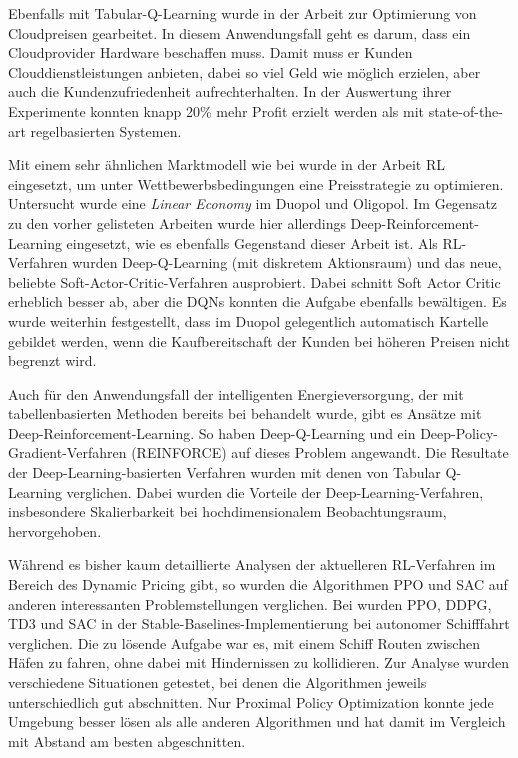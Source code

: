 Ebenfalls mit Tabular-Q-Learning wurde in der Arbeit \cite{9086147} zur Optimierung von Cloudpreisen gearbeitet.
In diesem Anwendungsfall geht es darum, dass ein Cloudprovider Hardware beschaffen muss.
Damit muss er Kunden Clouddienstleistungen anbieten, dabei so viel Geld wie möglich erzielen, aber auch die Kundenzufriedenheit aufrechterhalten.
In der Auswertung ihrer Experimente konnten knapp 20\% mehr Profit erzielt werden als mit state-of-the-art regelbasierten Systemen.

Mit einem sehr ähnlichen Marktmodell wie bei \cite{10.1145/3219819.3219833} wurde in der Arbeit \cite{Kastius2022} RL eingesetzt, um unter Wettbewerbsbedingungen eine Preisstrategie zu optimieren.
Untersucht wurde eine \textit{Linear Economy} im Duopol und Oligopol.
Im Gegensatz zu den vorher gelisteten Arbeiten wurde hier allerdings Deep-Reinforcement-Learning eingesetzt, wie es ebenfalls Gegenstand dieser Arbeit ist.
Als RL-Verfahren wurden Deep-Q-Learning (mit diskretem Aktionsraum) und das neue, beliebte Soft-Actor-Critic-Verfahren ausprobiert.
Dabei schnitt Soft Actor Critic erheblich besser ab, aber die DQNs konnten die Aufgabe ebenfalls bewältigen.
Es wurde weiterhin festgestellt, dass im Duopol gelegentlich automatisch Kartelle gebildet werden, wenn die Kaufbereitschaft der Kunden bei höheren Preisen nicht begrenzt wird.

Auch für den Anwendungsfall der intelligenten Energieversorgung, der mit tabellenbasierten Methoden bereits bei \cite{Kim2016DynamicPA} behandelt wurde, gibt es Ansätze mit Deep-Reinforcement-Learning.
So haben \cite{8356086} Deep-Q-Learning und ein Deep-Policy-Gradient-Verfahren (REINFORCE) auf dieses Problem angewandt.
Die Resultate der Deep-Learning-basierten Verfahren wurden mit denen von Tabular Q-Learning verglichen.
Dabei wurden die Vorteile der Deep-Learning-Verfahren, insbesondere Skalierbarkeit bei hochdimensionalem Beobachtungsraum, hervorgehoben.

Während es bisher kaum detaillierte Analysen der aktuelleren RL-Verfahren im Bereich des Dynamic Pricing gibt, so wurden die Algorithmen PPO und SAC auf anderen interessanten Problemstellungen verglichen.
Bei \cite{LarsenVessel} wurden PPO, DDPG, TD3 und SAC in der Stable-Baselines-Implementierung bei autonomer Schifffahrt verglichen.
Die zu lösende Aufgabe war es, mit einem Schiff Routen zwischen Häfen zu fahren, ohne dabei mit Hindernissen zu kollidieren.
Zur Analyse wurden verschiedene Situationen getestet, bei denen die Algorithmen jeweils unterschiedlich gut abschnitten.
Nur Proximal Policy Optimization konnte jede Umgebung besser lösen als alle anderen Algorithmen und hat damit im Vergleich mit Abstand am besten abgeschnitten.

